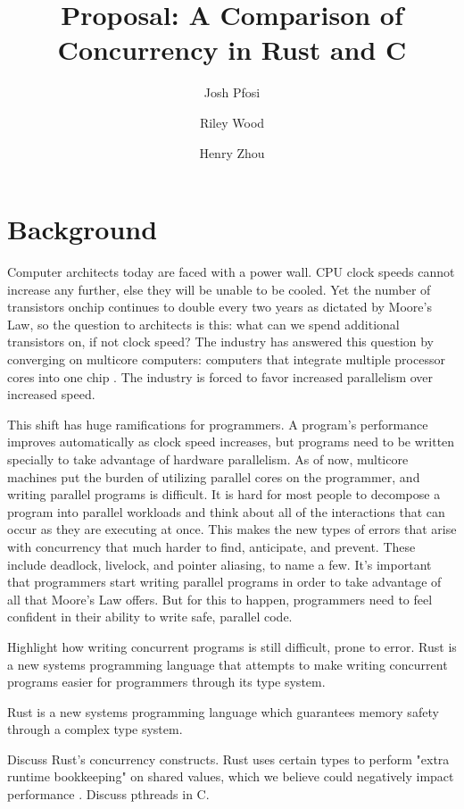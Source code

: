 \documentclass{article}
\title{Proposal: A Comparison of Concurrency in Rust and C}
\author{
    Josh Pfosi\\
    \and
    Riley Wood\\
    \and
    Henry Zhou\\
}
\begin{document}
\maketitle


\section*{Background}

Computer architects today are faced with a power wall. CPU clock speeds cannot increase any further, else they will be unable to be cooled. Yet the number of transistors onchip continues to double every two years as dictated by Moore's Law, so the question to architects is this: what can we spend additional transistors on, if not clock speed? The industry has answered this question by converging on multicore computers: computers that integrate multiple processor cores into
one chip \cite{Larus:2009}. The industry is forced to favor increased parallelism over increased speed.

This shift has huge ramifications for programmers. A program's performance improves automatically as clock speed increases, but programs need to be written specially to take advantage of hardware parallelism. As of now, multicore machines put the burden of utilizing parallel cores on the programmer, and writing parallel programs is difficult. It is hard for most people to decompose a program into parallel workloads and think about all of the interactions that can occur as they
are executing at once. This makes the new types of errors that arise with concurrency that much harder to find, anticipate, and prevent. These include deadlock, livelock, and pointer aliasing, to name a few. It's important that programmers start writing parallel programs in order to take advantage of all that Moore's Law offers. But for this to happen, programmers need to feel confident in their ability to write safe, parallel code.

Highlight how writing concurrent programs is still difficult, prone to error. Rust is a new systems programming language that attempts to make writing concurrent programs easier for programmers through its type system. 

Rust is a new systems programming language which guarantees memory safety through a complex type system. 

Discuss Rust's concurrency constructs. Rust uses certain types to perform "extra runtime bookkeeping" on shared values, which we believe could negatively impact performance \cite{rust-lang.org}. Discuss pthreads in C.
\end{document}
